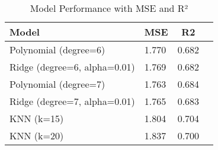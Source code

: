 \begin{table}
\centering
\caption{Model Performance with MSE and R²}
\label{tab:model_performance}
\begin{tabular}{|l|l|c|c|}
\toprule
                       Model &   MSE &    R2 \\
\midrule
       Polynomial (degree=6) & 1.770 & 0.682 \\
Ridge (degree=6, alpha=0.01) & 1.769 & 0.682 \\
       Polynomial (degree=7) & 1.763 & 0.684 \\
Ridge (degree=7, alpha=0.01) & 1.765 & 0.683 \\
                  KNN (k=15) & 1.804 & 0.704 \\
                  KNN (k=20) & 1.837 & 0.700 \\
\bottomrule
\end{tabular}
\end{table}
